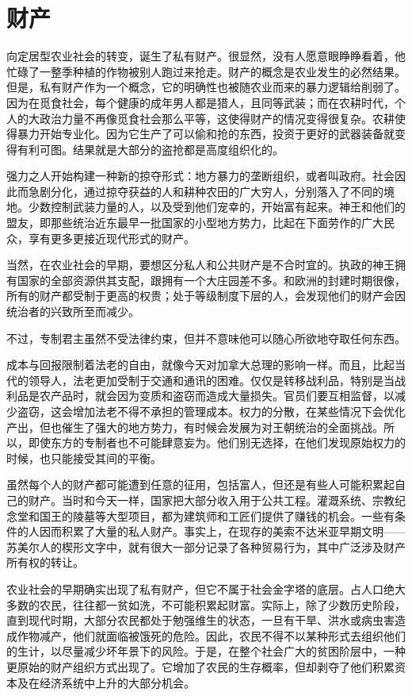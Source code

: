 \section{财产}
向定居型农业社会的转变，诞生了私有财产。很显然，没有人愿意眼睁睁看着，他忙碌了一整季种植的作物被别人跑过来抢走。财产的概念是农业发生的必然结果。但是，私有财产作为一个概念，它的明确性也被随农业而来的暴力逻辑给削弱了。因为在觅食社会，每个健康的成年男人都是猎人，且同等武装；而在农耕时代，个人的大政治力量不再像觅食社会那么平等，这使得财产的情况变得很复杂。农耕使得暴力开始专业化。因为它生产了可以偷和抢的东西，投资于更好的武器装备就变得有利可图。结果就是大部分的盗抢都是高度组织化的。

强力之人开始构建一种新的掠夺形式：地方暴力的垄断组织，或者叫政府。社会因此而急剧分化，通过掠夺获益的人和耕种农田的广大穷人，分别落入了不同的境地。少数控制武装力量的人，以及受到他们宠幸的，开始富有起来。神王和他们的盟友，即那些统治近东最早一批国家的小型地方势力，比起在下面劳作的广大民众，享有更多更接近现代形式的财产。

当然，在农业社会的早期，要想区分私人和公共财产是不合时宜的。执政的神王拥有国家的全部资源供其支配，跟拥有一个大庄园差不多。和欧洲的封建时期很像，所有的财产都受制于更高的权贵；处于等级制度下层的人，会发现他们的财产会因统治者的兴致所至而减少。

不过，专制君主虽然不受法律约束，但并不意味他可以随心所欲地夺取任何东西。

成本与回报限制着法老的自由，就像今天对加拿大总理的影响一样。而且，比起当代的领导人，法老更加受制于交通和通讯的困难。仅仅是转移战利品，特别是当战利品是农产品时，就会因为变质和盗窃而造成大量损失。官员们要互相监督，以减少盗窃，这会增加法老不得不承担的管理成本。权力的分散，在某些情况下会优化产出，但也催生了强大的地方势力，有时候会发展为对王朝统治的全面挑战。所以，即使东方的专制者也不可能肆意妄为。他们别无选择，在他们发现原始权力的时候，也只能接受其间的平衡。

虽然每个人的财产都可能遭到任意的征用，包括富人，但还是有些人可能积累起自己的财产。当时和今天一样，国家把大部分收入用于公共工程。灌溉系统、宗教纪念堂和国王的陵墓等大型项目，都为建筑师和工匠们提供了赚钱的机会。一些有条件的人因而积累了大量的私人财产。事实上，在现存的美索不达米亚早期文明——苏美尔人的楔形文字中，就有很大一部分记录了各种贸易行为，其中广泛涉及财产所有权的转让。

农业社会的早期确实出现了私有财产，但它不属于社会金字塔的底层。占人口绝大多数的农民，往往都一贫如洗，不可能积累起财富。实际上，除了少数历史阶段，直到现代时期，大部分农民都处于勉强维生的状态，一旦有干旱、洪水或病虫害造成作物减产，他们就面临被饿死的危险。因此，农民不得不以某种形式去组织他们的生计，以尽量减少坏年景下的风险。于是，在整个社会广大的贫困阶层中，一种更原始的财产组织方式出现了。它增加了农民的生存概率，但却剥夺了他们积累资本及在经济系统中上升的大部分机会。

